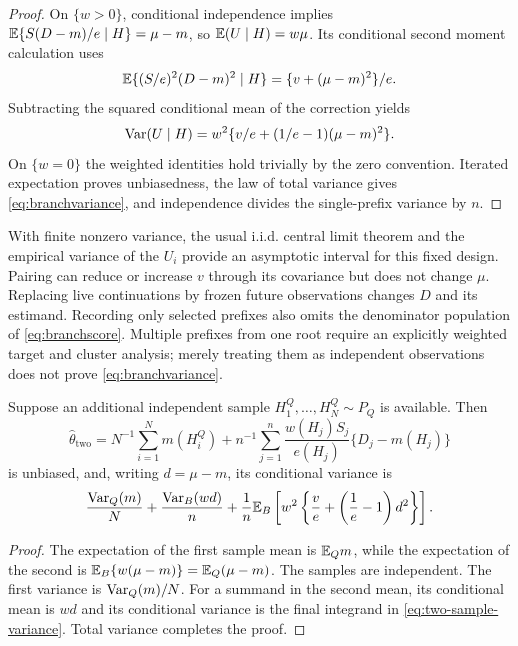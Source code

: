 \begin{proof}
On $\{w>0\}$, conditional independence implies $\mathbb{E}\{S(D-m)/e\mid H\}=\mu-m$, so $\mathbb{E}(U\mid H)=w\mu$. Its conditional second moment calculation uses
\[
 \mathbb{E}\{(S/e)^2(D-m)^2\mid H\}
 =\{v+(\mu-m)^2\}/e.
\]
Subtracting the squared conditional mean of the correction yields
\[
 \operatorname{Var}(U\mid H)=w^2\{v/e+(1/e-1)(\mu-m)^2\}.
\]
On $\{w=0\}$ the weighted identities hold trivially by the zero convention. Iterated expectation proves unbiasedness, the law of total variance gives \eqref{eq:branchvariance}, and independence divides the single-prefix variance by $n$.
\end{proof}

With finite nonzero variance, the usual i.i.d. central limit theorem and the empirical variance of the $U_i$ provide an asymptotic interval for this fixed design. Pairing can reduce or increase $v$ through its covariance but does not change $\mu$. Replacing live continuations by frozen future observations changes $D$ and its estimand. Recording only selected prefixes also omits the denominator population of \eqref{eq:branchscore}. Multiple prefixes from one root require an explicitly weighted target and cluster analysis; merely treating them as independent observations does not prove \eqref{eq:branchvariance}.

\begin{corollary}
\label{cor:two-sample-branch}
Suppose an additional independent sample $H_1^Q,\ldots,H_N^Q\sim P_Q$ is available. Then
\begin{equation}
 \widehat\theta_{\mathrm{two}}
 =N^{-1}\sum_{i=1}^Nm(H_i^Q)
 +n^{-1}\sum_{j=1}^n\frac{w(H_j)S_j}{e(H_j)}\{D_j-m(H_j)\}
 \label{eq:two-sample-branch}
\end{equation}
is unbiased, and, writing $d=\mu-m$, its conditional variance is
\begin{equation}
 \frac{\operatorname{Var}_Q(m)}{N}
 +\frac{\operatorname{Var}_B(wd)}{n}
 +\frac1n\mathbb{E}_B\left[w^2\left\{\frac{v}{e}+
                \left(\frac1e-1\right)d^2\right\}\right].
 \label{eq:two-sample-variance}
\end{equation}
\end{corollary}

\begin{proof}
The expectation of the first sample mean is $\mathbb{E}_Qm$, while the expectation of the second is $\mathbb{E}_B\{w(\mu-m)\}=\mathbb{E}_Q(\mu-m)$. The samples are independent. The first variance is $\operatorname{Var}_Q(m)/N$. For a summand in the second mean, its conditional mean is $wd$ and its conditional variance is the final integrand in \eqref{eq:two-sample-variance}. Total variance completes the proof.
\end{proof}

